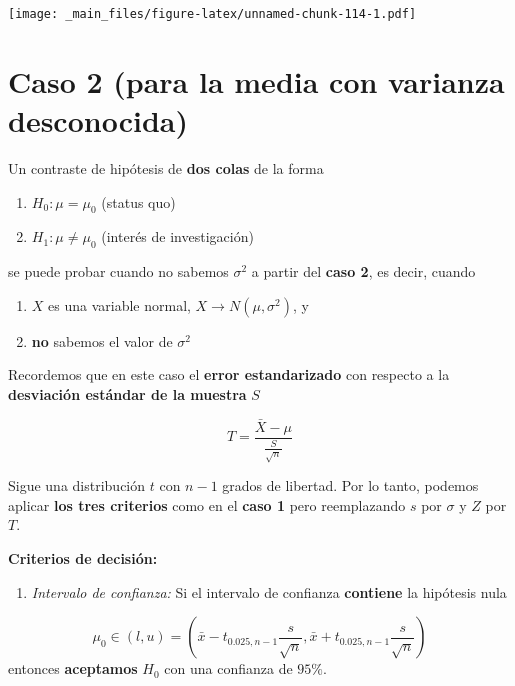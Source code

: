 \documentclass[
]{book}
\providecommand{\tightlist}{%
  \setlength{\itemsep}{0pt}\setlength{\parskip}{0pt}}
\begin{document}
\texttt{[image: \_main\_files/figure-latex/unnamed-chunk-114-1.pdf]}

\hypertarget{caso-2-para-la-media-con-varianza-desconocida}{%
\section{Caso 2 (para la media con varianza desconocida)}\label{caso-2-para-la-media-con-varianza-desconocida}}

Un contraste de hipótesis de \textbf{dos colas} de la forma

\begin{enumerate}
\def\labelenumi{\alph{enumi}.}
\tightlist
\item
  \(H_0:\mu = \mu_0\) (status quo)
\item
  \(H_1:\mu \neq \mu_0\) (interés de investigación)
\end{enumerate}

se puede probar cuando no sabemos \(\sigma^2\) a partir del \textbf{caso 2}, es decir, cuando

\begin{enumerate}
\def\labelenumi{\arabic{enumi}.}
\tightlist
\item
  \(X\) es una variable normal, \(X \rightarrow N(\mu, \sigma^2)\), y
\item
  \textbf{no} sabemos el valor de \(\sigma^2\)
\end{enumerate}

Recordemos que en este caso el \textbf{error estandarizado} con respecto a la \textbf{desviación estándar de la muestra} \(S\)

\[T=\frac{\bar{X}-\mu}{\frac{S}{\sqrt{n}}}\]

Sigue una distribución \(t\) con \(n-1\) grados de libertad. Por lo tanto, podemos aplicar \textbf{los tres criterios} como en el \textbf{caso 1} pero reemplazando \(s\) por \(\sigma\) y \(Z\) por \(T\).

\textbf{Criterios de decisión:}

\begin{enumerate}
\def\labelenumi{\arabic{enumi}.}
\tightlist
\item
  \emph{Intervalo de confianza:} Si el intervalo de confianza \textbf{contiene} la hipótesis nula
\end{enumerate}

\[\mu_0\in (l,u)=(\bar{x}-t_{0.025,n-1} \frac{s}{\sqrt{n}}, \bar{x}+t_{0.025, n-1} \frac{s}{\sqrt{n}})\] entonces \textbf{aceptamos} \(H_0\) con una confianza de \(95\%\).
\end{document}
